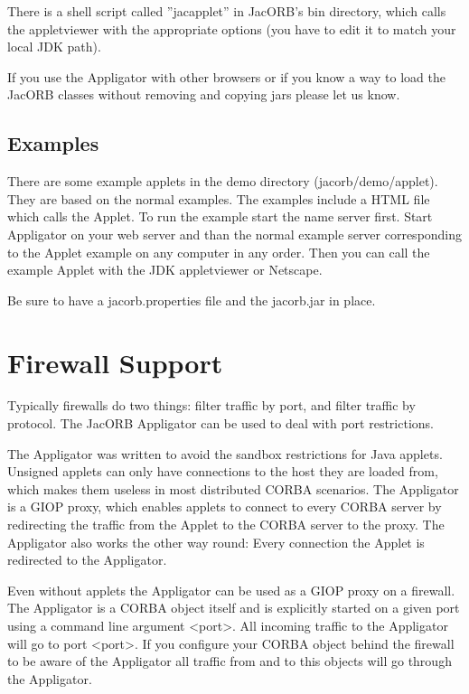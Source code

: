 \documentclass[12pt]{scrbook}
\begin{document}
There is a shell script called ''jacapplet'' in JacORB's bin
directory, which calls the appletviewer with the appropriate options
(you have to edit it to match your local JDK path).

If you use the Appligator with other browsers or if you know a way to
load the JacORB classes without removing and copying jars please let
us know.  

\subsection{Examples}

There are some example applets in the demo directory
(jacorb/demo/applet). They are based on the normal examples. The
examples include a HTML file which calls the Applet. To run the
example start the name server first. Start Appligator on your web
server and than the normal example server corresponding to the Applet
example on any computer in any order. Then you can call the example
Applet with the JDK appletviewer or Netscape. 

Be sure to have a jacorb.properties file and the jacorb.jar in place. 

\section{Firewall Support}

Typically firewalls do two things: filter traffic by port, and filter
traffic by protocol. The JacORB Appligator can be used to deal with
port restrictions.

The Appligator was written to avoid the sandbox restrictions for Java
applets. Unsigned applets can only have connections to the host they
are loaded from, which makes them useless in most distributed CORBA
scenarios. The Appligator is a GIOP proxy, which enables applets to
connect to every CORBA server by redirecting the traffic from the
Applet to the CORBA server to the proxy. The Appligator also works the
other way round: Every connection the Applet is redirected to the
Appligator.

Even without applets the Appligator can be used as a GIOP proxy on a
firewall. The Appligator is a CORBA object itself and is explicitly
started on a given port using a command line argument <port>. All
incoming traffic to the Appligator will go to port <port>. If you
configure your CORBA object behind the firewall to be aware of the
Appligator all traffic from and to this objects will go through the
Appligator.
\end{document}
